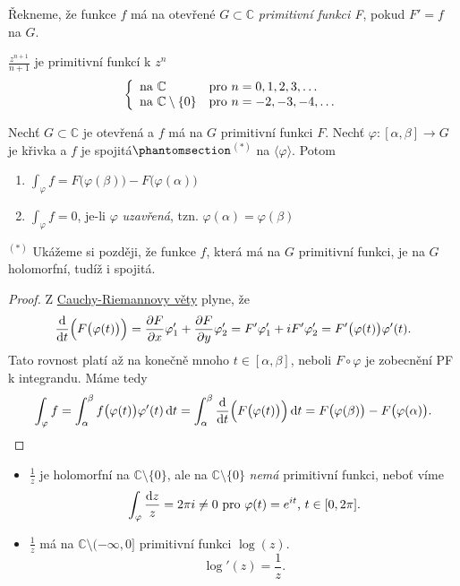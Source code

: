 \begin{definition}
Řekneme, že funkce $f$ má na otevřené $G\subset\mathbb{C}$ \emph{primitivní funkci F}, pokud $F'=f$ na $G$.
\end{definition}

\begin{example}
$\frac{z^{n+1}}{n+1}$ je primitivní funkcí k $z^n$
$$\left\{ \begin{array}{ll} \text{na } \mathbb{C} & \mbox{pro } n=0,1,2,3, \dots \\ \text{na } \mathbb{C}\setminus\{0\} & \mbox{pro } n=-2,-3,-4, \dots \end{array} \right.$$
\end{example}

\begin{theorem}
Nechť $G\subset\mathbb{C}$ je otevřená a $f$ má na $G$ primitivní funkci $F$. Nechť $\varphi:[\alpha,\beta]\rightarrow G$ je křivka a $f$ je spojitá$\phantomsection$\hyperref[$^{(*)}$end]{$^{(*)}$} \label{^{(*)}start}na $\langle\varphi\rangle$. Potom
\begin{enumerate}
    \item $\int_\varphi f=F\bigl(\varphi(\beta)\bigr)-F\bigl(\varphi(\alpha)\bigr)$
    \item $\int_\varphi f=0$, je-li $\varphi$ \emph{uzavřená}, tzn. $\varphi(\alpha)=\varphi(\beta)$
\end{enumerate}
\end{theorem}
\begin{note}
\hyperref[^{(*)}start]{$^{(*)}$} \label{$^{(*)}$end} Ukážeme si později, že funkce $f$, která má na $G$ primitivní funkci, je na $G$ holomorfní, tudíž i spojitá.
\end{note}

\begin{proof}
Z \hyperref[CR]{Cauchy-Riemannovy věty} plyne, že 
$$\frac{\mathop{}\!\mathrm{d}}{\mathop{}\!\mathrm{d} t}\Bigl(F\bigl(\varphi(t)\bigr)\Bigr)=\frac{\partial F}{\partial x}\varphi'_1+\frac{\partial F}{\partial y}\varphi'_2=F'\varphi'_1+iF'\varphi'_2=F'\bigl(\varphi(t)\bigr)\varphi'(t)\text{.}$$
Tato rovnost platí až na konečně mnoho $t\in[\alpha,\beta]$, neboli $F\circ\varphi$ je zobecnění PF k integrandu.
Máme tedy
$$\int_\varphi f=\int_\alpha^\beta f\bigl(\varphi(t)\bigr)\varphi'(t)\mathop{}\!\mathrm{d} t
=\int_\alpha^\beta \frac{\mathop{}\!\mathrm{d}}{\mathop{}\!\mathrm{d} t}\Bigl(F\bigl(\varphi(t)\bigr)\Bigr)\mathop{}\!\mathrm{d} t=
F\bigl(\varphi(\beta)\bigr)-F\bigl(\varphi(\alpha)\bigr)\text{.}$$
\end{proof}

\begin{example}
\mbox{}
\begin{itemize}
    \item $\frac{1}{z}$ je holomorfní na $\mathbb{C}\setminus\{0\}$, ale na $\mathbb{C}\setminus\{0\}$ \emph{nemá} primitivní funkci, neboť víme $$\int_\varphi \frac{\mathop{}\!\mathrm{d} z}{z}=2\pi i \neq 0 \text{ pro } \varphi(t)=e^{it}\text{, } t \in [0,2\pi]\text{.}$$ 
    \item $\frac{1}{z}$ má na $\mathbb{C}\setminus(-\infty,0]$ primitivní funkci $\log(z)$. $$\log'(z)=\frac{1}{z}\text{.}$$
\end{itemize}
\end{example}

